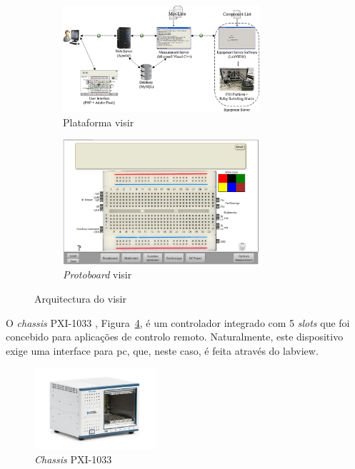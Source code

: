 \begin{figure}[hbtp]
    \centering
    \begin{subfigure}[hbtp]{0.48\textwidth}
        \centering
        \includegraphics[width=0.8\textwidth]{figures/arquitectura_VISIR.png}
        \caption{Plataforma \acrshort{visir} \cite{tawfikexperiences}}
        \label{fig:platvisir}
    \end{subfigure}
    \begin{subfigure}[hbtp]{0.48\textwidth}
        \includegraphics[width=0.8\textwidth]{figures/protboard_visir.png}
        \caption{\textit{Protoboard} \acrshort{visir}}
        \label{fig:protoboadrvisir}
    \end{subfigure}
    \caption{Arquitectura do \acrshort{visir}}
    \label{fig:arquitecturavisir}
\end{figure}

O \textit{chassis} PXI-1033 \cite{PXI-1033}, Figura~\ref{fig:PXI-1033}, é um controlador integrado com 5 \textit{slots} que foi concebido para aplicações de controlo remoto. Naturalmente, este dispositivo exige uma interface para \acrshort{pc}, que, neste caso, é feita através do \acrshort{labview}.

\begin{figure}[hbtp]
    \centering
    \includegraphics[width=0.4\textwidth]{figures/PXI-1033.png}
    \caption{\textit{Chassis} PXI-1033 \cite{PXI-1033}}
    \label{fig:PXI-1033}
\end{figure}

